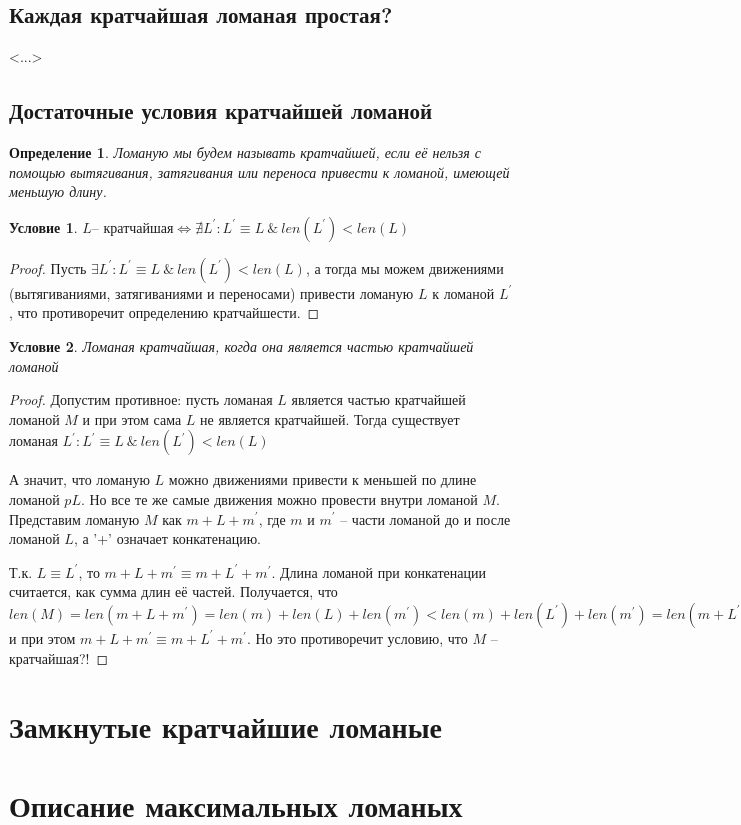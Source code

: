\documentclass[12pt,a4paper, flushleft]{article}
\newtheorem{Def}{Определение}[section]
\newtheorem{Con}{Условие}[section]
\newcommand{\p}[1]{#1^{\prime}}
\begin{document}
\subsection{Каждая кратчайшая ломаная простая?}
	<...>
\subsection{Достаточные условия кратчайшей ломаной}
\begin{Def}
Ломаную мы будем называть кратчайшей, если её нельзя с помощью вытягивания, затягивания
или переноса привести к ломаной, имеющей меньшую длину.
\end{Def}

\begin{Con}
	$L \text{-- кратчайшая}\Longleftrightarrow\nexists \p L: \p L\equiv L ~\&~ len(\p L)<len(L)$
\end{Con}
\begin{proof}
	Пусть $\exists \p L: \p L\equiv L ~\&~ len(\p L)<len(L)$, а тогда мы можем движениями (вытягиваниями, затягиваниями и переносами) привести ломаную $L$  к ломаной $\p L$, что противоречит определению кратчайшести.
\end{proof}	

\begin{Con}
	Ломаная кратчайшая, когда она является частью кратчайшей ломаной
\end{Con}
\begin{proof}
	Допустим противное: пусть ломаная $L$ является частью кратчайшей ломаной $M$ и при этом сама $L$ не является кратчайшей. Тогда существует ломаная $\p L: \p L\equiv L~\&~ len(\p L)<len(L)$
	
	А значит, что ломаную $L$ можно движениями привести к меньшей по длине ломаной $p L$. Но все те же самые движения можно провести внутри ломаной $M$. Представим ломаную $M$ как $m + L + \p m$, где $m$ и $\p m$ -- части ломаной до и после ломаной $L$, а '+' означает конкатенацию. 
	
	Т.к. $L\equiv \p L$, то $m + L + \p m\equiv m+\p L + \p m$. Длина ломаной при конкатенации считается, как сумма длин её частей. Получается, что $len(M) = len(m+L+\p m) = len(m) + len(L) + len(\p m) < len(m) + len(\p L) + len(\p m) = len(m+\p L + \p m)$ и при этом $m+L+\p m\equiv m+\p L+\p m$. Но это противоречит условию, что $M$ -- кратчайшая?!
	
	
\end{proof}

\section{Замкнутые кратчайшие ломаные}

\section{Описание максимальных ломаных}
\end{document}
